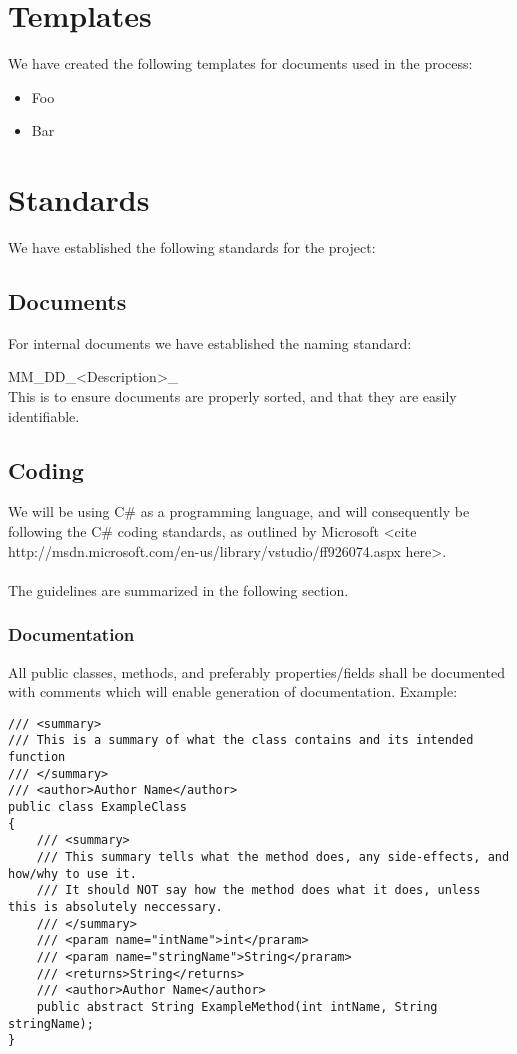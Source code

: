 \documentclass[12pt, a4paper]{article}
\begin{document}
\section{Templates}
We have created the following templates for documents used in the process:

\begin{itemize}

\item Foo
\item Bar

\end{itemize}

\section{Standards}
We have established the following standards for the project:

\subsection{Documents}
For internal documents we have established the naming standard:

MM\_DD\_<Description>\_<Version if applicable>
\\
This is to ensure documents are properly sorted, and that they are easily identifiable.



\subsection{Coding}
We will be using C\# as a programming language, and will consequently be following the C\# coding standards, as outlined by Microsoft <cite http://msdn.microsoft.com/en-us/library/vstudio/ff926074.aspx here>.
\\\\
The guidelines are summarized in the following section.\\

\subsubsection{Documentation}
All public classes, methods, and preferably properties/fields shall be documented with comments which will enable generation of documentation. Example:
\begin{lstlisting}
/// <summary>
/// This is a summary of what the class contains and its intended function
/// </summary>
/// <author>Author Name</author>
public class ExampleClass
{
	/// <summary>
	/// This summary tells what the method does, any side-effects, and how/why to use it.
	/// It should NOT say how the method does what it does, unless this is absolutely neccessary.
	/// </summary>
	/// <param name="intName">int</praram>
	/// <param name="stringName">String</praram>
	/// <returns>String</returns>
	/// <author>Author Name</author>
	public abstract String ExampleMethod(int intName, String stringName);
}
\end{lstlisting}
\end{document}
